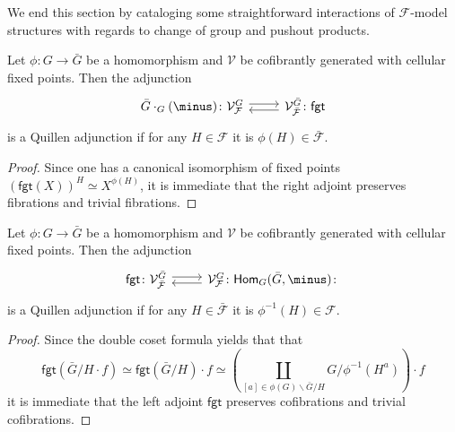 \documentclass[a4paper,10pt]{article}%
\begin{document}
We end this section by cataloging some straightforward interactions of $\mathcal{F}$-model structures
with regards to change of group and pushout products.


\begin{proposition}\label{FGTRIGHT PROP}
	Let $\phi \colon G \to \bar{G}$ be a homomorphism and $\mathcal{V}$ be cofibrantly generated with cellular fixed points.	
	Then the adjunction
\begin{equation}
\begin{tikzcd}
	\bar{G}\cdot_G(\minus)
	\colon
	\mathcal{V}^{G}_{\mathcal{F}} \ar[shift left=1]{r}
&
	\mathcal{V}^{\bar{G}}_{\bar{\mathcal{F}}}
	\colon \ar[shift left=1]{l}
	\mathsf{fgt}
\end{tikzcd}
\end{equation}
is a Quillen adjunction if for any 
$H \in \mathcal{F}$ it is $\phi(H) \in \bar{\mathcal{F}}$.
\end{proposition}

\begin{proof}
Since one has a canonical isomorphism of fixed points
$\left(\mathsf{fgt}(X)\right)^H \simeq X^{\phi(H)}$,
it is immediate that the right adjoint preserves fibrations and trivial fibrations.
\end{proof}


\begin{proposition}\label{FGTLEFT PROP}
	Let $\phi \colon G \to \bar{G}$ be a homomorphism and $\mathcal{V}$ be cofibrantly generated with cellular fixed points.		
	Then the adjunction
\begin{equation}
\begin{tikzcd}
	\mathsf{fgt}
	\colon
	\mathcal{V}^{\bar{G}}_{\mathcal{\bar{F}}} \ar[shift left=1]{r}
&
	\mathcal{V}^{G}_{\mathcal{F}}
	\colon
	\mathsf{Hom}_G(\bar{G},\minus)
	\colon \ar[shift left=1]{l}
\end{tikzcd}
\end{equation}
is a Quillen adjunction if for any 
$H \in \bar{\mathcal{F}}$ it is 
$\phi^{-1}(H) \in \mathcal{F}$.
\end{proposition}


\begin{proof}
	Since the double coset formula yields that that
\[
	\mathsf{fgt}\left(\bar{G}/H \cdot f\right)
		\simeq 
	\mathsf{fgt}\left(\bar{G}/H\right) \cdot f
		\simeq
	\left(
		\coprod_{[a] \in \phi(G)\backslash \bar{G} /H}
		{G/\phi^{-1}(H^{a})}
	\right)	\cdot f
\]
it is immediate that the left adjoint $\mathsf{fgt}$ preserves cofibrations and trivial cofibrations.
\end{proof}
\end{document}
